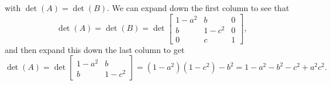 \documentclass{amsart}
\renewcommand{\:}       {\colon}
\begin{document}
\begin{enumerate}
\[  \]
  with $\det(A)=\det(B)$.  We can expand down the first column to see
  that
  \[ \det(A)=\det(B)=\det\left[\begin{array}{ccc} 
      1-a^2 & b     & 0 \\
      b     & 1-c^2 & 0 \\
      0     & c     & 1
     \end{array}\right],
  \]
  and then expand this down the last column to get
  \[ \det(A) =
      \det\left[\begin{array}{cc}
       1-a^2 & b \\ b & 1-c^2
      \end{array}\right] =
      (1-a^2)(1-c^2)-b^2 = 1-a^2-b^2-c^2+a^2c^2.
  \]

\end{enumerate} 

\closegraphsfile
\end{document}
